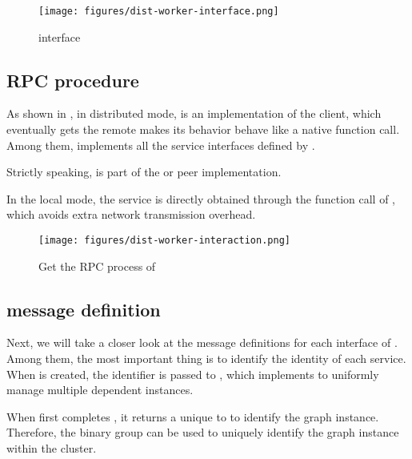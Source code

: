 \begin{content}
\begin{figure}[H]
\centering
\texttt{[image: figures/dist-worker-interface.png]}
\caption{interface}
 \label{fig:dist-worker-interface}
\end{figure}

\subsection{RPC procedure}

As shown in , in distributed mode,  is an implementation of the  client, which eventually gets the remote  makes its behavior behave like a native function call. Among them,  implements all the service interfaces defined by .

\begin{remark}
Strictly speaking,  is part of the  or peer implementation.
\end{remark}

In the local mode, the  service is directly obtained through the function call of , which avoids extra network transmission overhead.

\begin{figure}[H]
\centering
\texttt{[image: figures/dist-worker-interaction.png]}
\caption{Get the RPC process of }
 \label{fig:dist-worker-interaction}
\end{figure}

\subsection{message definition}

Next, we will take a closer look at the message definitions for each interface of . Among them, the most important thing is to identify the identity of each service. When  is created, the  identifier is passed to , which implements  to uniformly manage multiple dependent  instances.

When  first completes , it returns a unique  to  to identify the graph instance. Therefore, the  binary group can be used to uniquely identify the graph instance within the cluster.


\end{content}
